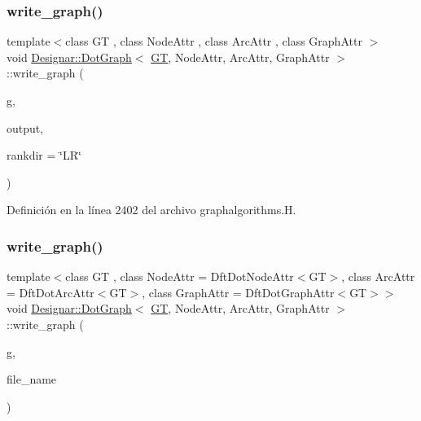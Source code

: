 \subsubsection{\texorpdfstring{write\+\_\+graph()}{write\_graph()}\hspace{0.1cm}{\footnotesize\ttfamily [1/2]}}
{\footnotesize\ttfamily template$<$class GT , class Node\+Attr , class Arc\+Attr , class Graph\+Attr $>$ \\
void \hyperlink{class_designar_1_1_dot_graph}{Designar\+::\+Dot\+Graph}$<$ \hyperlink{demo-buildgraph_8_c_a3001c40d2c31ca87ed96cd7d1334a55e}{GT}, Node\+Attr, Arc\+Attr, Graph\+Attr $>$\+::write\+\_\+graph (\begin{DoxyParamCaption}\item[{const \hyperlink{demo-buildgraph_8_c_a3001c40d2c31ca87ed96cd7d1334a55e}{GT} \&}]{g,  }\item[{std\+::ofstream \&}]{output,  }\item[{const std\+::string \&}]{rankdir = {\ttfamily \char`\"{}LR\char`\"{}} }\end{DoxyParamCaption})}



Definición en la línea 2402 del archivo graphalgorithms.\+H.

\mbox{\label{class_designar_1_1_dot_graph_a6f2b98b76d2c970ad875a59388f693cb}} 
\subsubsection{\texorpdfstring{write\+\_\+graph()}{write\_graph()}\hspace{0.1cm}{\footnotesize\ttfamily [2/2]}}
{\footnotesize\ttfamily template$<$class GT , class Node\+Attr  = Dft\+Dot\+Node\+Attr$<$\+G\+T$>$, class Arc\+Attr  = Dft\+Dot\+Arc\+Attr$<$\+G\+T$>$, class Graph\+Attr  = Dft\+Dot\+Graph\+Attr$<$\+G\+T$>$$>$ \\
void \hyperlink{class_designar_1_1_dot_graph}{Designar\+::\+Dot\+Graph}$<$ \hyperlink{demo-buildgraph_8_c_a3001c40d2c31ca87ed96cd7d1334a55e}{GT}, Node\+Attr, Arc\+Attr, Graph\+Attr $>$\+::write\+\_\+graph (\begin{DoxyParamCaption}\item[{const \hyperlink{demo-buildgraph_8_c_a3001c40d2c31ca87ed96cd7d1334a55e}{GT} \&}]{g,  }\item[{const std\+::string \&}]{file\+\_\+name }\end{DoxyParamCaption})\hspace{0.3cm}{\ttfamily [inline]}}



